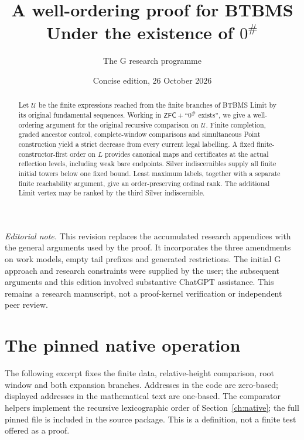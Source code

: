 \documentclass[11pt,a4paper]{article}
\title{\textbf{A well-ordering proof for BTBMS}\\
 \large Under the existence of $0^\#$}
\author{The G research programme}
\date{Concise edition, 26 October 2026}
\theoremstyle{definition}
\numberwithin{equation}{section}
\begin{document}
\maketitle
\begin{abstract}
Let $\mathscr U$ be the finite expressions reached from the finite
branches of BTBMS Limit by its original fundamental sequences. Working
in $\mathsf{ZFC}+\text{``}0^\#\text{ exists''}$, we give a well-ordering
argument for the original recursive comparison on $\mathscr U$.
Finite completion, graded ancestor control, complete-window comparisons
and simultaneous Point construction yield a strict decrease from every
current legal labelling. A fixed finite-constructor-first order on $L$
provides canonical maps and certificates at the actual reflection levels,
including weak bare endpoints. Silver indiscernibles supply all finite
initial towers below one fixed bound. Least maximum labels, together
with a separate finite reachability argument, give an order-preserving
ordinal rank. The additional Limit vertex may be ranked by the third
Silver indiscernible.
\end{abstract}
\noindent\textit{Editorial note.}
This revision replaces the accumulated research appendices with the
general arguments used by the proof. It incorporates the three amendments
on work models, empty tail prefixes and generated restrictions. The
initial G approach and research constraints were supplied by the user;
the subsequent arguments and this edition involved substantive ChatGPT
assistance. This remains a research manuscript, not a proof-kernel
verification or independent peer review.
\begingroup\setlength{\parskip}{0pt}\tableofcontents\endgroup


\clearpage
\appendix
\section{The pinned native operation}\label{app:code}
The following excerpt fixes the finite data, relative-height comparison,
root window and both expansion branches. Addresses in the code are
zero-based; displayed addresses in the mathematical text are one-based.
The comparator helpers implement the recursive lexicographic order of
Section~\ref{ch:native}; the full pinned file is included in the source
package. This is a definition, not a finite test offered as a proof.

\end{document}
